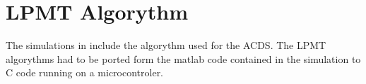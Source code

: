 \chapter{\acs{LPMT} Algorythm}

The simulations in \cite{mench11} include the algorythm used for the \ac{ACDS}. The \ac{LPMT} algorythms had to be ported form the matlab code contained in the simulation to C code running on a microcontroler. 

